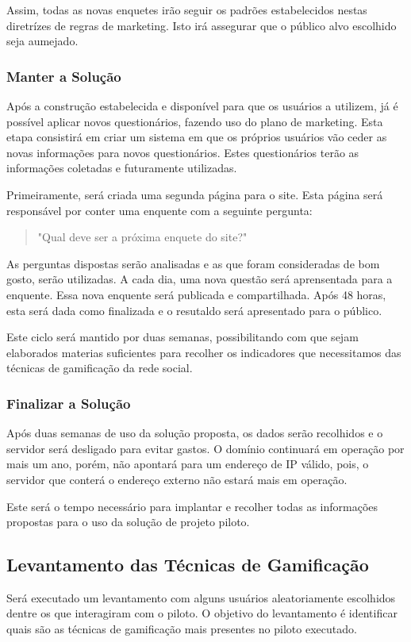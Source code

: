 Assim, todas as novas enquetes irão seguir os padrões estabelecidos nestas diretrízes de regras de marketing. Isto irá assegurar que
o público alvo escolhido seja aumejado.


\subsubsection{Manter a Solução}
\label{sub:definir_tecnologia}
Após a construção estabelecida e disponível para que os usuários a utilizem, já é possível aplicar novos questionários, fazendo uso do plano de marketing.
Esta etapa consistirá em criar um sistema em que os próprios usuários vão ceder as novas informações para novos questionários. Estes questionários 
terão as informações coletadas e futuramente utilizadas.

Primeiramente, será criada uma segunda página para o site. Esta página será responsável por conter uma enquente com a seguinte pergunta:

 \begin{quote}
     "Qual deve ser a próxima enquete do site?"
 \end{quote}

As perguntas dispostas serão analisadas e as que foram consideradas de bom gosto, serão utilizadas. A cada dia, uma nova questão será aprensentada
para a enquente. Essa nova enquente será publicada e compartilhada. Após 48 horas, esta será dada como finalizada e o resutaldo será apresentado
para o público. 

Este ciclo será mantido por duas semanas, possibilitando com que sejam elaborados materias suficientes para recolher os indicadores que necessitamos 
das técnicas de gamificação da rede social.
\subsubsection{Finalizar a Solução}
\label{sub:definir_tecnologia}

Após duas semanas de uso da solução proposta, os dados serão recolhidos e o servidor será desligado para evitar gastos. O domínio continuará em operação
por mais um ano, porém, não apontará para um endereço de IP válido, pois, o servidor que conterá o endereço externo não estará mais em operação.

Este será o tempo necessário para implantar e recolher todas as informações propostas para o uso da solução de projeto piloto.

\subsection{Levantamento das Técnicas de Gamificação}
\label{sub:survey_para_t_cnicas_de_gamifica_o}
Será executado um levantamento com alguns usuários aleatoriamente escolhidos dentre os que interagiram com o piloto.
O objetivo do levantamento é identificar quais são as técnicas de gamificação mais presentes no piloto executado.

